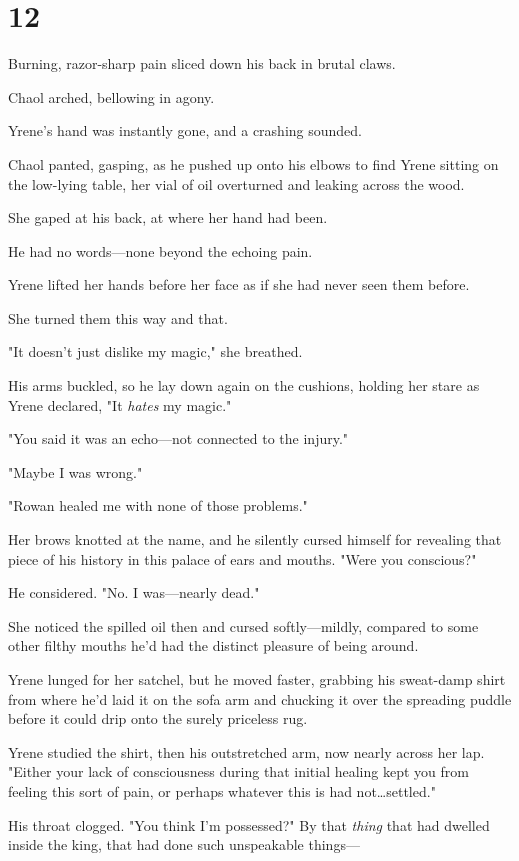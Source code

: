 
\chapter{12}

Burning, razor-sharp pain sliced down his back in brutal claws.

Chaol arched, bellowing in agony.

Yrene's hand was instantly gone, and a crashing sounded.

Chaol panted, gasping, as he pushed up onto his elbows to find Yrene sitting on the low-lying table, her vial of oil overturned and leaking across the wood.

She gaped at his back, at where her hand had been.

He had no words---none beyond the echoing pain.

Yrene lifted her hands before her face as if she had never seen them before.

She turned them this way and that.

"It doesn't just dislike my magic," she breathed.

His arms buckled, so he lay down again on the cushions, holding her stare as Yrene declared, "It \emph{hates} my magic."

"You said it was an echo---not connected to the injury."

"Maybe I was wrong."

"Rowan healed me with none of those problems."

Her brows knotted at the name, and he silently cursed himself for revealing that piece of his history in this palace of ears and mouths.
"Were you conscious?"

He considered.
"No.
I was---nearly dead."

She noticed the spilled oil then and cursed softly---mildly, compared to some other filthy mouths he'd had the distinct pleasure of being around.

Yrene lunged for her satchel, but he moved faster, grabbing his sweat-damp shirt from where he'd laid it on the sofa arm and chucking it over the spreading puddle before it could drip onto the surely priceless rug.

Yrene studied the shirt, then his outstretched arm, now nearly across her lap.
"Either your lack of consciousness during that initial healing kept you from feeling this sort of pain, or perhaps whatever this is had not\ldots settled."

His throat clogged.
"You think I'm possessed?"
By that \emph{thing}
that had dwelled inside the king, that had done such unspeakable things---


